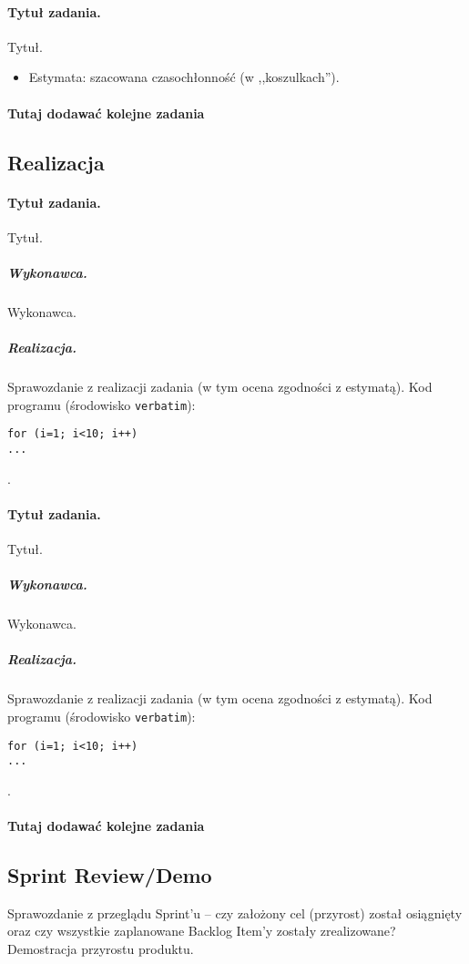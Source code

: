 \documentclass[a4paper]{article}
\begin{document}
\paragraph{Tytuł zadania.} Tytuł.
\begin{itemize}
\item Estymata: szacowana czasochłonność (w ,,koszulkach'').
\end{itemize}

\paragraph{Tutaj dodawać kolejne zadania}

\subsection{Realizacja}

\paragraph{Tytuł zadania.} Tytuł.
\subparagraph{Wykonawca.} Wykonawca.
\subparagraph{Realizacja.} Sprawozdanie z realizacji zadania (w tym ocena zgodności z estymatą). Kod programu (środowisko \texttt{verbatim}): \begin{verbatim}
for (i=1; i<10; i++)
...
\end{verbatim}.

\paragraph{Tytuł zadania.} Tytuł.
\subparagraph{Wykonawca.} Wykonawca.
\subparagraph{Realizacja.} Sprawozdanie z realizacji zadania (w tym ocena zgodności z estymatą). Kod programu (środowisko \texttt{verbatim}): \begin{verbatim}
for (i=1; i<10; i++)
...
\end{verbatim}.

\paragraph{Tutaj dodawać kolejne zadania}


\subsection{Sprint Review/Demo}
Sprawozdanie z przeglądu Sprint'u -- czy założony cel (przyrost) został osiągnięty oraz czy wszystkie zaplanowane Backlog Item'y zostały zrealizowane? Demostracja przyrostu produktu.
\end{document}
